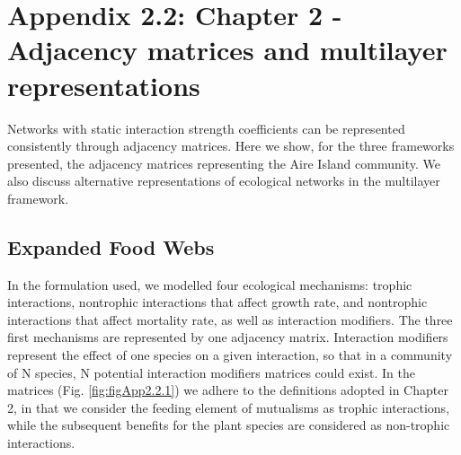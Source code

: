 \chapter[Appendix 2.2: Chapter 2 - Adjacency matrices]{Appendix 2.2: Chapter 2 - Adjacency matrices and multilayer representations}\label{ch:Appendix2.2}
\renewcommand{\thefigure}{A.2.2.\arabic{figure}}
\setcounter{figure}{0}

\renewcommand{\thetable}{A.2.2.\arabic{table}}
\setcounter{table}{0}

Networks with static interaction strength coefficients can be represented consistently through adjacency matrices. Here we show, for the three frameworks presented, the adjacency matrices representing the Aire Island community. We also discuss alternative representations of ecological networks in the multilayer framework.

\section*{Expanded Food Webs}

In the formulation used, we modelled four ecological mechanisms: trophic interactions, nontrophic interactions that affect growth rate, and nontrophic interactions that affect mortality rate, as well as interaction modifiers. The three first mechanisms are represented by one adjacency matrix. Interaction modifiers represent the effect of one species on a given interaction, so that in a community of N species, N potential interaction modifiers matrices could exist. In the matrices (Fig. \ref{fig:figApp2.2.1}) we adhere to the definitions adopted in Chapter 2, in that we consider the feeding element of mutualisms as trophic interactions, while the subsequent benefits for the plant species are considered as non-trophic interactions.

